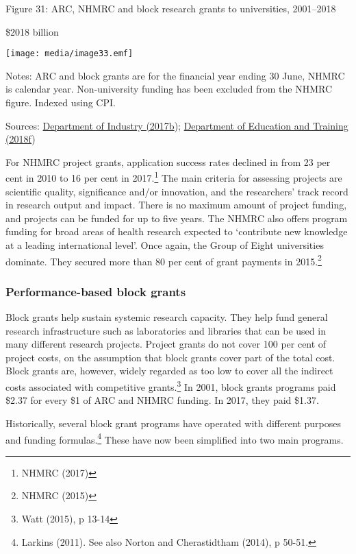 \documentclass[]{book}
\begin{document}
\protect\hypertarget{_Ref452049331}{}{}Figure 31: ARC, NHMRC and block research grants to universities, 2001--2018

\$2018 billion

\texttt{[image: media/image33.emf]}

Notes: ARC and block grants are for the financial year ending 30 June, NHMRC is calendar year. Non-university funding has been excluded from the NHMRC figure. Indexed using CPI.

Sources: \protect\hyperlink{_ENREF_102}{Department of Industry (2017b}); \protect\hyperlink{_ENREF_85}{Department of Education and Training (2018f})

For NHMRC project grants, application success rates declined in from 23 per cent in 2010 to 16 per cent in 2017.\footnote{NHMRC (2017)} The main criteria for assessing projects are scientific quality, significance and/or innovation, and the researchers' track record in research output and impact. There is no maximum amount of project funding, and projects can be funded for up to five years. The NHMRC also offers program funding for broad areas of health research expected to `contribute new knowledge at a leading international level'. Once again, the Group of Eight universities dominate. They secured more than 80 per cent of grant payments in 2015.\footnote{NHMRC (2015)}

\hypertarget{performance-based-block-grants}{%
\subsubsection{Performance-based block grants}\label{performance-based-block-grants}}

Block grants help sustain systemic research capacity. They help fund general research infrastructure such as laboratories and libraries that can be used in many different research projects. Project grants do not cover 100 per cent of project costs, on the assumption that block grants cover part of the total cost. Block grants are, however, widely regarded as too low to cover all the indirect costs associated with competitive grants.\footnote{Watt (2015), p 13-14} In 2001, block grants programs paid \$2.37 for every \$1 of ARC and NHMRC funding. In 2017, they paid \$1.37.

Historically, several block grant programs have operated with different purposes and funding formulas.\footnote{Larkins (2011). See also Norton and Cherastidtham (2014), p 50-51.} These have now been simplified into two main programs.
\end{document}
